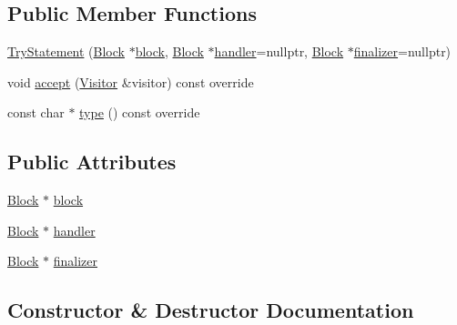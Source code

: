 \subsection*{Public Member Functions}
\begin{DoxyCompactItemize}
\item 
\hyperlink{struct_try_statement_ac3dece791d96a6aa4ce0b5c944ae20f0}{Try\+Statement} (\hyperlink{struct_block}{Block} $\ast$\hyperlink{struct_try_statement_aeea1fa5fce0062d0f8d427d4706d1f73}{block}, \hyperlink{struct_block}{Block} $\ast$\hyperlink{struct_try_statement_a4d97ad90948102f8e6dca2051f03ceb0}{handler}=nullptr, \hyperlink{struct_block}{Block} $\ast$\hyperlink{struct_try_statement_a95cbb6dbd527aad85fa40f0b8b98b66c}{finalizer}=nullptr)
\item 
void \hyperlink{struct_try_statement_af223e8205727843aa77651caeb89b805}{accept} (\hyperlink{struct_visitor}{Visitor} \&visitor) const override
\item 
const char $\ast$ \hyperlink{struct_try_statement_a1113af03994575c6d5c0f814642f4503}{type} () const override
\end{DoxyCompactItemize}
\subsection*{Public Attributes}
\begin{DoxyCompactItemize}
\item 
\hyperlink{struct_block}{Block} $\ast$ \hyperlink{struct_try_statement_aeea1fa5fce0062d0f8d427d4706d1f73}{block}
\item 
\hyperlink{struct_block}{Block} $\ast$ \hyperlink{struct_try_statement_a4d97ad90948102f8e6dca2051f03ceb0}{handler}
\item 
\hyperlink{struct_block}{Block} $\ast$ \hyperlink{struct_try_statement_a95cbb6dbd527aad85fa40f0b8b98b66c}{finalizer}
\end{DoxyCompactItemize}


\subsection{Constructor \& Destructor Documentation}
\mbox{\label{struct_try_statement_ac3dece791d96a6aa4ce0b5c944ae20f0}} 
